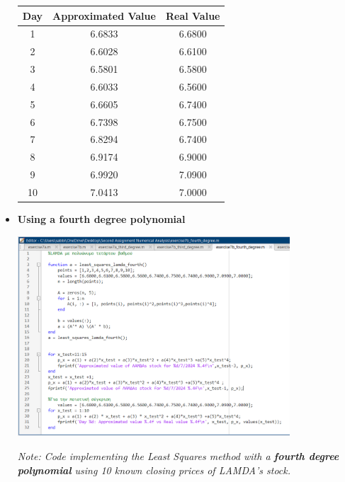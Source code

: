 \documentclass{article}
\begin{document}
\begin{itemize}
\begin{center}
    
    \centering
     \begin{tabular}{@{}ccc@{}}
        \toprule
        \textbf{Day} & \textbf{Approximated Value} & \textbf{Real Value} \\ \midrule
        1 & 6.6833 & 6.6800 \\
        2 & 6.6028 & 6.6100 \\
        3 & 6.5801 & 6.5800 \\
        4 & 6.6033 & 6.5600 \\
        5 & 6.6605 & 6.7400 \\
        6 & 6.7398 & 6.7500 \\
        7 & 6.8294 & 6.7400 \\
        8 & 6.9174 & 6.9000 \\
        9 & 6.9920 & 7.0900 \\
        10 & 7.0413 & 7.0000 \\ \bottomrule
    \end{tabular}
    \end{center}
\item \textbf{Using a fourth degree polynomial}
\begin{tcolorbox}[colback=red!10, colframe=gray!80, width=\textwidth, sharp corners]
    \centering 
    \includegraphics[width=0.8\textwidth,height=0.38\textheight]{Exercise7bFourth.png} 

    \vspace{0.1cm}
    \small\textit{Note: Code implementing the Least Squares method with a \textbf{fourth degree polynomial} using 10 known closing prices of LAMDA's stock. }
\end{tcolorbox}


\end{itemize}
\end{document}
